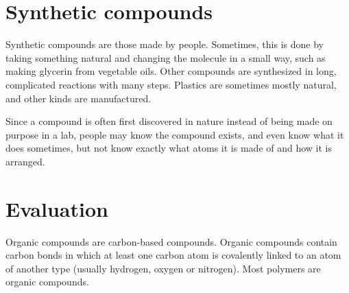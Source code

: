 \documentclass{beamer}
\begin{document}
\section{Synthetic compounds}
\begin{frame}
	Synthetic compounds are those made by people. Sometimes, this is done by taking something 
	natural and changing the molecule in a small way, such as making glycerin from vegetable oils. 
	Other compounds are synthesized in long, complicated reactions with many steps. Plastics are 
	sometimes mostly natural, and other kinds are manufactured.
	\newline
	\newline

	Since a compound is often first discovered in nature instead of being made on purpose in a lab, 
	people may know the compound exists, and even know what it does sometimes, but not know exactly 
	what atoms it is made of and how it is arranged.
\end{frame}


\section{Evaluation}
\begin{frame}
	Organic compounds are carbon-based compounds. Organic compounds contain carbon bonds in which 
	at least one carbon atom is covalently linked to an atom of another type 
	(usually hydrogen, oxygen or nitrogen). Most polymers are organic compounds.
\end{frame}
\end{document}

